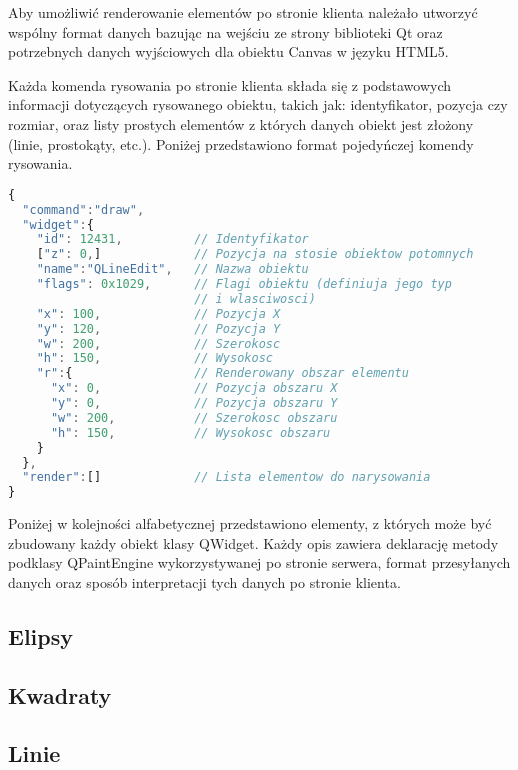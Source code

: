 Aby umożliwić renderowanie elementów po stronie klienta należało utworzyć wspólny format danych bazując na wejściu ze strony biblioteki Qt oraz potrzebnych danych wyjściowych dla obiektu Canvas w języku HTML5. 

Każda komenda rysowania po stronie klienta składa się z podstawowych informacji dotyczących rysowanego obiektu, takich jak: identyfikator, pozycja czy rozmiar, oraz listy prostych elementów z których danych obiekt jest złożony (linie, prostokąty, etc.). Poniżej przedstawiono format pojedyńczej komendy rysowania.


\begin{lstlisting}[language=JavaScript,numbers=none,caption=Komenda renderowania elementu interfejsu]
{
  "command":"draw",
  "widget":{
    "id": 12431,          // Identyfikator
    ["z": 0,]             // Pozycja na stosie obiektow potomnych
    "name":"QLineEdit",   // Nazwa obiektu
    "flags": 0x1029,      // Flagi obiektu (definiuja jego typ 
                          // i wlasciwosci)
    "x": 100,             // Pozycja X
    "y": 120,             // Pozycja Y
    "w": 200,             // Szerokosc
    "h": 150,             // Wysokosc
    "r":{                 // Renderowany obszar elementu
      "x": 0,             // Pozycja obszaru X
      "y": 0,             // Pozycja obszaru Y
      "w": 200,           // Szerokosc obszaru
      "h": 150,           // Wysokosc obszaru
    }
  },
  "render":[]             // Lista elementow do narysowania
}
\end{lstlisting}

Poniżej w kolejności alfabetycznej przedstawiono elementy, z których może być zbudowany każdy obiekt klasy QWidget. Każdy opis zawiera deklarację metody podklasy QPaintEngine wykorzystywanej po stronie serwera, format przesyłanych danych oraz sposób interpretacji tych danych po stronie klienta.

\subsection{Elipsy}


\subsection{Kwadraty}


\subsection{Linie}


